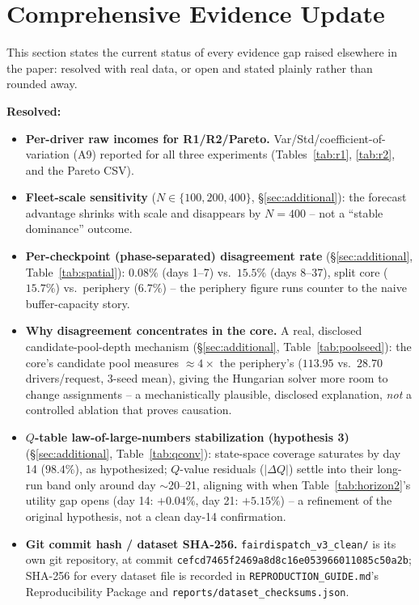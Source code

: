 \documentclass[10pt,twocolumn,a4paper]{article}
\begin{document}
\section{Comprehensive Evidence Update}
\label{sec:missing}
This section states the current status of every evidence gap raised
elsewhere in the paper: resolved with real data, or open and stated
plainly rather than rounded away.

\textbf{Resolved:}
\begin{itemize}
\item \textbf{Per-driver raw incomes for R1/R2/Pareto.}
Var/Std/coefficient-of-variation (A9) reported for all three experiments
(Tables~\ref{tab:r1}, \ref{tab:r2}, and the Pareto CSV).
\item \textbf{Fleet-scale sensitivity} ($N\in\{100,200,400\}$,
\S\ref{sec:additional}): the forecast advantage shrinks with scale and
disappears by $N{=}400$ -- not a ``stable dominance'' outcome.
\item \textbf{Per-checkpoint (phase-separated) disagreement rate}
(\S\ref{sec:additional}, Table~\ref{tab:spatial}): $0.08\%$ (days 1--7) vs.\
$15.5\%$ (days 8--37), split core ($15.7\%$) vs.\ periphery ($6.7\%$) --
the periphery figure runs counter to the naive buffer-capacity story.
\item \textbf{Why disagreement concentrates in the core.} A real,
disclosed candidate-pool-depth mechanism (\S\ref{sec:additional},
Table~\ref{tab:poolseed}): the core's candidate pool measures
$\approx4\times$ the periphery's ($113.95$ vs.\ $28.70$ drivers/request,
3-seed mean), giving the Hungarian solver more room to change assignments
-- a mechanistically plausible, disclosed explanation, \emph{not} a
controlled ablation that proves causation.
\item \textbf{$Q$-table law-of-large-numbers stabilization (hypothesis 3)}
(\S\ref{sec:additional}, Table~\ref{tab:qconv}): state-space coverage
saturates by day 14 ($98.4\%$), as hypothesized; $Q$-value residuals
($|\Delta Q|$) settle into their long-run band only around day
$\sim$20--21, aligning with when Table~\ref{tab:horizon2}'s utility gap
opens (day 14: $+0.04\%$, day 21: $+5.15\%$) -- a refinement of the
original hypothesis, not a clean day-14 confirmation.
\item \textbf{Git commit hash / dataset SHA-256.}
\texttt{fairdispatch\_v3\_clean/} is its own git repository, at commit
\texttt{cefcd7465f2469a8d8c16e053966011085c50a2b}; SHA-256 for every
dataset file is recorded in \texttt{REPRODUCTION\_GUIDE.md}'s
Reproducibility Package and \texttt{reports/dataset\_checksums.json}.

\end{itemize}
\end{document}
